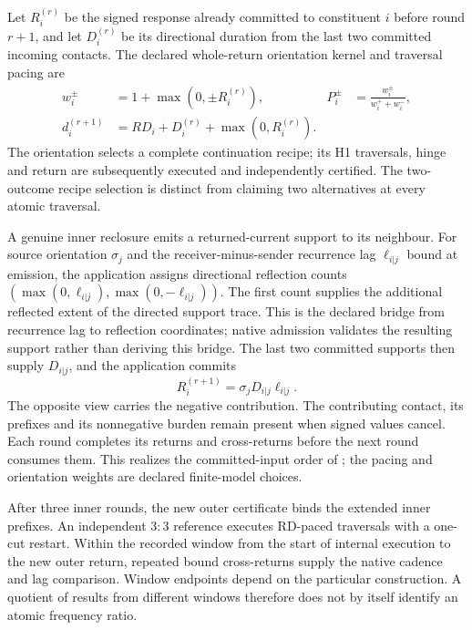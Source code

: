 Let \(R_i^{(r)}\) be the signed response already committed to constituent \(i\)
before round \(r+1\), and let \(D_i^{(r)}\) be its directional duration from
the last two committed incoming contacts. The declared whole-return orientation
kernel and traversal pacing are
\begin{align}
w_i^{\pm}&=1+\max(0,\pm R_i^{(r)}),&
P_i^{\pm}&=\frac{w_i^{\pm}}{w_i^++w_i^-},
\label{eq:manual2-campaign-orientation}\\
d_i^{(r+1)}&=RD_i+D_i^{(r)}+\max(0,R_i^{(r)}).
\label{eq:manual2-campaign-pacing}
\end{align}
The orientation selects a complete continuation recipe; its H1 traversals,
hinge and return are subsequently executed and independently certified. The
two-outcome recipe selection is distinct from claiming two alternatives at
every atomic traversal.

A genuine inner reclosure emits a returned-current support to its neighbour.
For source orientation \(\sigma_j\) and the receiver-minus-sender recurrence
lag \(\ell_{i|j}\) bound at emission, the application assigns directional
reflection counts \((\max(0,\ell_{i|j}),\max(0,-\ell_{i|j}))\). The first
count supplies the additional reflected extent of the directed support trace.
This is the declared bridge from recurrence lag to reflection coordinates;
native admission validates the resulting support rather than deriving this
bridge. The last two committed supports then supply \(D_{i|j}\), and the
application commits
\begin{equation}
R_i^{(r+1)}=\sigma_jD_{i|j}\ell_{i|j}.
\label{eq:manual2-campaign-response}
\end{equation}
The opposite view carries the negative contribution. The contributing contact,
its prefixes and its nonnegative burden remain present when signed values
cancel. Each round completes its returns and cross-returns before the next
round consumes them. This realizes the committed-input order of
; the pacing and orientation weights are
declared finite-model choices.

After three inner rounds, the new outer certificate binds the extended inner
prefixes. An independent \(3{:}3\) reference executes RD-paced traversals with
a one-cut restart. Within the recorded window from the start of internal
execution to the new outer return, repeated bound cross-returns supply the
native cadence and lag comparison. Window endpoints depend on the particular
construction. A quotient of results from different windows therefore does not
by itself identify an atomic frequency ratio.

